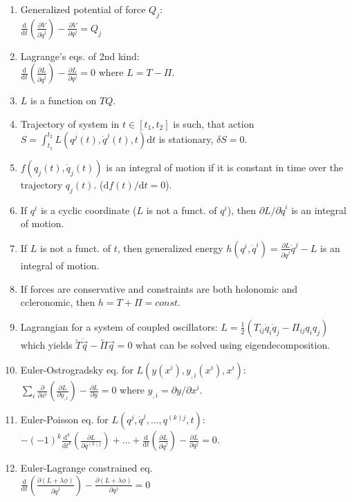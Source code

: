 \documentclass{article}
\renewcommand\d{\mathrm d}
\begin{document}
\begin{multicols}{3}
\begin{enumerate}
            \item Generalized potential of force $Q_j$:\\ $\frac{\d}{\d t}\left(\frac{\partial V}{\partial\dot q^j}\right)-\frac{\partial V}{\partial q^j}=Q_j$
            \item Lagrange's eqs. of 2nd kind: \\$\frac{\d}{\d t}\left(\frac{\partial L}{\partial\dot q^j}\right)-\frac{\partial L}{\partial q^j}=0$ where $L=T-\Pi$.
            \item $L$ is a function on $TQ$.
            \item Trajectory of system in $t\in[t_1,t_2]$ is such, that action $S=\int_{t_1}^{t_2}L(q^j(t),\dot q^j(t),t)\d t$ is stationary, $\delta S=0$.
            \item $f(q_j(t),\dot q_j(t))$ is an integral of motion if it is constant in time over the trajectory $q_j(t)$. ($\d f(t)/\d t=0$).
            \item If $q^i$ is a cyclic coordinate ($L$ is not a funct. of $q^i$), then $\partial L/\partial\dot q^i$ is an integral of motion.
            \item If $L$ is not a funct. of $t$, then generalized energy $h(q^i,\dot q^i)=\frac{\partial L}{\partial\dot q^j} \dot q^j-L$ is an integral of motion.
            \item If forces are conservative and constraints are both holonomic and ccleronomic, then $h=T+\Pi=const.$
            \item Lagrangian for a system of coupled oscillators: $L=\frac{1}{2}\left(T_{ij}\dot q_i\dot q_j-\Pi_{ij}q_iq_j\right)$ which yields $\tilde T\ddot{\vec q}-\tilde\Pi\vec q=0$ what can be solved using eigendecomposition.
            \item Euler-Ostrogradsky eq. for $L(y(x^i), y_{,i}(x^i), x^i)$:  \\$\sum_i\frac{\partial}{\partial x^i}\left(\frac{\partial L}{\partial y_{,i}}\right)-\frac{\partial L}{\partial y}=0$ where $y_{,i}=\partial y/\partial x^i$.
            \item Euler-Poisson eq. for $L(q^j, \dot q^j,\ldots,q^{(k)j}, t)$:  \\$-(-1)^k\frac{\d^k}{\d t^k}\left(\frac{\partial L}{\partial q^{(k)j}}\right)+\dots+\frac{\d}{\d t}\left(\frac{\partial L}{\partial\dot q^j}\right)-\frac{\partial L}{\partial q^j}=0$.
            \item Euler-Lagrange constrained eq. \\$\frac{\d}{\d t}\left(\frac{\partial(L+\lambda\phi)}{\partial\dot q^j}\right)-\frac{\partial(L+\lambda\phi)}{\partial q^j}=0$

\end{enumerate}
\end{multicols}
\end{document}
